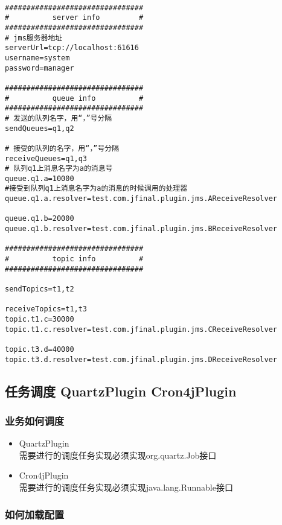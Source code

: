 \documentclass{scrartcl}
\begin{document}
\begin{verbatim}

################################
#          server info         #
################################
# jms服务器地址
serverUrl=tcp://localhost:61616
username=system
password=manager

################################
#          queue info          #
################################
# 发送的队列名字，用“，”号分隔
sendQueues=q1,q2

# 接受的队列的名字，用“，”号分隔
receiveQueues=q1,q3
# 队列q1上消息名字为a的消息号
queue.q1.a=10000
#接受到队列q1上消息名字为a的消息的时候调用的处理器
queue.q1.a.resolver=test.com.jfinal.plugin.jms.AReceiveResolver

queue.q1.b=20000
queue.q1.b.resolver=test.com.jfinal.plugin.jms.BReceiveResolver

################################
#          topic info          #
################################

sendTopics=t1,t2

receiveTopics=t1,t3
topic.t1.c=30000
topic.t1.c.resolver=test.com.jfinal.plugin.jms.CReceiveResolver

topic.t3.d=40000
topic.t3.d.resolver=test.com.jfinal.plugin.jms.DReceiveResolver
\end{verbatim}
\subsection{任务调度  QuartzPlugin Cron4jPlugin}
\label{sec-2-4}

  
\subsubsection{业务如何调度}
\label{sec-2-4-1}
\begin{itemize}

\item QuartzPlugin\\
\label{sec-2-4-1-1}%
需要进行的调度任务实现必须实现org.quartz.Job接口


\item Cron4jPlugin\\
\label{sec-2-4-1-2}%
需要进行的调度任务实现必须实现java.lang.Runnable接口
\end{itemize} %
\subsubsection{如何加载配置}
\label{sec-2-4-2}
\end{document}
